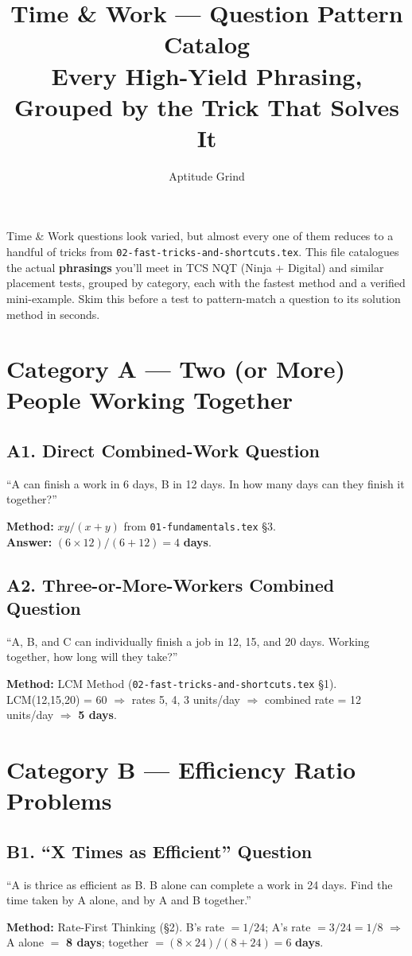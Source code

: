 \documentclass[11pt]{article}
\title{\color{primary}\textbf{Time \& Work --- Question Pattern Catalog}\\[4pt]\large Every High-Yield Phrasing, Grouped by the Trick That Solves It}
\author{Aptitude Grind}
\date{}
\begin{document}
\maketitle
\thispagestyle{fancy}

\noindent Time \& Work questions look varied, but almost every one of them reduces to a handful of
tricks from \texttt{02-fast-tricks-and-shortcuts.tex}. This file catalogues the actual
\textbf{phrasings} you'll meet in TCS NQT (Ninja + Digital) and similar placement tests, grouped by
category, each with the fastest method and a verified mini-example. Skim this before a test to
pattern-match a question to its solution method in seconds.

\section*{Category A --- Two (or More) People Working Together}

\subsection*{A1. Direct Combined-Work Question}
\begin{tipbox}[Phrasing]
``A can finish a work in 6 days, B in 12 days. In how many days can they finish it together?''
\end{tipbox}
\textbf{Method:} $xy/(x+y)$ from \texttt{01-fundamentals.tex} \S3. \\
\textbf{Answer:} $(6 \times 12)/(6+12) = 4$ \textbf{days}.

\subsection*{A2. Three-or-More-Workers Combined Question}
\begin{tipbox}[Phrasing]
``A, B, and C can individually finish a job in 12, 15, and 20 days. Working together, how long will
they take?''
\end{tipbox}
\textbf{Method:} LCM Method (\texttt{02-fast-tricks-and-shortcuts.tex} \S1). LCM(12,15,20) = 60
$\Rightarrow$ rates 5, 4, 3 units/day $\Rightarrow$ combined rate = 12 units/day $\Rightarrow$
\textbf{5 days}.

\section*{Category B --- Efficiency Ratio Problems}

\subsection*{B1. ``X Times as Efficient'' Question}
\begin{tipbox}[Phrasing]
``A is thrice as efficient as B. B alone can complete a work in 24 days. Find the time taken by A
alone, and by A and B together.''
\end{tipbox}
\textbf{Method:} Rate-First Thinking (\S2). B's rate $=1/24$; A's rate $=3/24=1/8$ $\Rightarrow$ A
alone $=$ \textbf{8 days}; together $=(8\times24)/(8+24)=6$ \textbf{days}.
\end{document}
